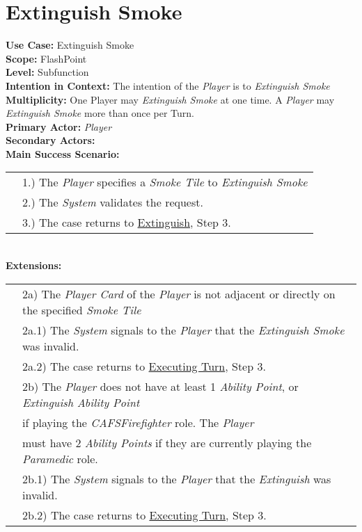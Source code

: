 \documentclass{article}
\begin{document}
	\section*{Extinguish Smoke}
	\textbf{Use Case:} Extinguish Smoke\\
	\textbf{Scope:} FlashPoint\\
	\textbf{Level:} Subfunction\\
	\textbf{Intention in Context:} The intention of the \textit{Player} is to \textit{Extinguish Smoke} \\
	\textbf{Multiplicity: } One Player may \textit{Extinguish Smoke} at one time. A \textit{Player} may \textit{Extinguish Smoke} more than once per Turn.\\
	\textbf{Primary Actor:} \textit{Player}\\
	\textbf{Secondary Actors:}\\
	\textbf{Main Success Scenario:}\\
	\begin{tabular}{l l}
		&1.) The \textit{Player} specifies a \textit{Smoke Tile} to \textit{Extinguish Smoke}\\
		&2.) The \textit{System} validates the request.\\
		&3.) The case returns to \underline{Extinguish}, Step 3.\\
	\end{tabular}\\
	\textbf{Extensions:}\\
	\begin{tabular}{l l}
		&2a) The \textit{Player Card} of the \textit{Player} is not adjacent or directly on the specified \textit{Smoke Tile} \\
		&\qquad 2a.1) The \textit{System} signals to the \textit{Player} that the \textit{Extinguish Smoke} was invalid.\\ 
		&\qquad 2a.2) The case returns to \underline{Executing Turn}, Step 3.\\
		&2b) The \textit{Player} does not have at least 1 \textit{Ability Point}, or \textit{Extinguish Ability Point}\\
		&\qquad if playing the \textit{CAFSFirefighter} role. The \textit{Player}\\
		&\qquad must have 2 \textit{Ability Points} if they are currently playing the \textit{Paramedic} role.\\
		&\qquad 2b.1) The \textit{System} signals to the \textit{Player} that the \textit{Extinguish} was invalid.\\ 
		&\qquad 2b.2) The case returns to \underline{Executing Turn}, Step 3.\\
	\end{tabular}
	
\end{document}
